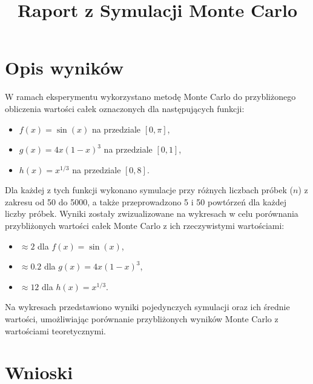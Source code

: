 \documentclass{article}
\title{Raport z Symulacji Monte Carlo}
\author{}
\date{}
\begin{document}
\maketitle

\section*{Opis wyników}

W ramach eksperymentu wykorzystano metodę Monte Carlo do przybliżonego obliczenia wartości całek oznaczonych dla następujących funkcji:
\begin{itemize}
    \item \( f(x) = \sin(x) \) na przedziale \( [0, \pi] \),
    \item \( g(x) = 4x(1 - x)^3 \) na przedziale \( [0, 1] \),
    \item \( h(x) = x^{1/3} \) na przedziale \( [0, 8] \).
\end{itemize}

Dla każdej z tych funkcji wykonano symulacje przy różnych liczbach próbek (\( n \)) z zakresu od 50 do 5000, a także przeprowadzono 5 i 50 powtórzeń dla każdej liczby próbek. Wyniki zostały zwizualizowane na wykresach w celu porównania przybliżonych wartości całek Monte Carlo z ich rzeczywistymi wartościami:
\begin{itemize}
    \item \( \approx 2 \) dla \( f(x) = \sin(x) \),
    \item \( \approx 0.2 \) dla \( g(x) = 4x(1 - x)^3 \),
    \item \( \approx 12 \) dla \( h(x) = x^{1/3} \).
\end{itemize}

Na wykresach przedstawiono wyniki pojedynczych symulacji oraz ich średnie wartości, umożliwiając porównanie przybliżonych wyników Monte Carlo z wartościami teoretycznymi.

\section*{Wnioski}
\end{document}
